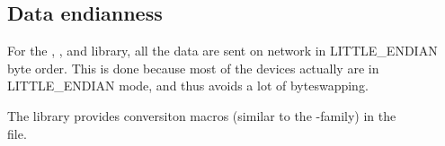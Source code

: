 \subsection*{Data endianness}

For the , ,  and  library, all the data are sent on network in LITTLE\_ENDIAN byte order. This is done because most of the devices actually are in LITTLE\_ENDIAN mode, and thus avoids a lot of byteswapping.

The  library provides conversiton macros (similar to the -family) in the\\
 file.

